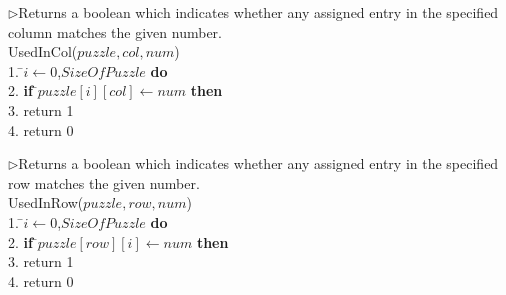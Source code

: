 \documentclass[12pt, letterpaper, twoside]{article}
\begin{document}
            \begin{center}
            \begin{tabbing}
            $\rhd$Returns a boolean which indicates whether any assigned entry
               in the specified\\ column matches the given number.\\
            UsedInCol($puzzle, col, num $) \\
            1.  \=$i \leftarrow 0$,$SizeOfPuzzle$ {\bf do} \\
            2. \indent            \> {\bf if} \=$puzzle[i][col] \leftarrow num$ {\bf then} \\
            3. \indent 	      \> 	\>  return 1 \\
            4. \indent return 0 \\
            \end{tabbing}
            \label{fig_alg_ex}
            \end{center}

            \begin{center}
            \begin{tabbing}
            $\rhd$Returns a boolean which indicates whether any assigned entry
               in the specified\\ row matches the given number.\\
            UsedInRow($puzzle, row, num $) \\
            1.  \=$i \leftarrow 0$,$SizeOfPuzzle$ {\bf do} \\
            2. \indent            \> {\bf if} \=$puzzle[row][i] \leftarrow num$ {\bf then} \\
            3. \indent 	      \> 	\>  return 1 \\
            4. \indent return 0 \\
            \end{tabbing}
            \label{fig_alg_ex}
            \end{center}
\end{document}
